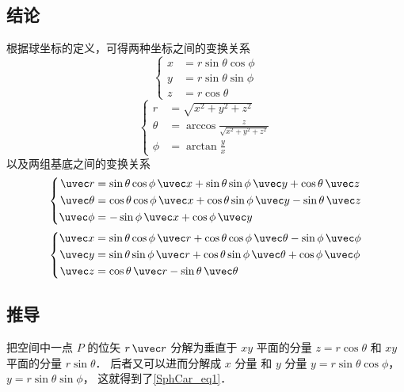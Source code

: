 

\subsection{结论}
根据球坐标的定义，可得两种坐标之间的变换关系
\begin{equation}\label{SphCar_eq1}
\left\{ \begin{aligned}
x &= r\sin \theta \cos \phi \\
y &= r\sin \theta \sin \phi \\
z &= r\cos \theta 
\end{aligned} \right.
\end{equation}
\begin{equation}\label{SphCar_eq2}
\left\{ \begin{aligned}
r &= \sqrt {x^2 + y^2 + z^2} \\
\theta  &= \arccos \frac{z}{\sqrt {{x^2} + {y^2} + {z^2}} }\\
\phi  &= \arctan \frac{y}{x}
\end{aligned} \right.
\end{equation}
以及两组基底之间的变换关系
\begin{equation}\label{SphCar_eq3}
\left\{ \begin{aligned}
\uvec r &= \sin\theta\cos\phi\,\uvec x + \sin\theta\sin\phi\,\uvec y + \cos\theta\,\uvec z\\
\uvec \theta  &= \cos\theta\cos\phi\,\uvec x + \cos\theta\sin\phi\,\uvec y - \sin\theta\,\uvec z\\
\uvec \phi  &=  - \sin\phi\,\uvec x + \cos\phi\,\uvec y
\end{aligned} \right.
\end{equation}
\begin{equation}\label{SphCar_eq4}
\left\{ \begin{aligned}
\uvec x &= \sin \theta \cos \phi \,\uvec r + \cos \theta \cos \phi \,\uvec \theta  - \sin \phi \,\uvec \phi \\
\uvec y &= \sin \theta \sin \phi \,\uvec r + \cos \theta \sin \phi \,\uvec \theta  + \cos \phi \,\uvec \phi \\
\uvec z &= \cos \theta \,\uvec r - \sin \theta \,\uvec \theta 
\end{aligned} \right.
\end{equation}
\subsection{推导}
把空间中一点 $P$ 的位矢 $r \,\uvec r$ 分解为垂直于 $xy$ 平面的分量 $z = r\cos \theta $ 和 $xy$ 平面的分量 $r\sin \theta $． 后者又可以进而分解成 $x$ 分量 和 $y$ 分量  $y = r\sin \theta \cos \phi$，  $y = r\sin \theta \sin \phi$， 这就得到了\autoref{SphCar_eq1}．


